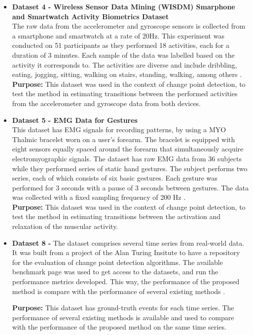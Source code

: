 \begin{itemize}
    
\item \textbf{Dataset 4 - Wireless Sensor Data Mining (WISDM) Smarphone and Smartwatch Activity Biometrics Dataset}\\
The raw data from the accelerometer and gyroscope sensors is collected from a smartphone and smartwatch at a rate of 20Hz. This experiment was conducted on 51 participants as they performed 18 activities, each for a duration of 3 minutes. Each sample of the data was labelled based on the activity it corresponds to. The activities are diverse and include dribbling, eating, jogging, sitting, walking on stairs, standing, walking, among others \cite{dataset4}.\\
\textbf{Purpose:} This dataset was used in the context of change point detection, to test the method in estimating transitions between the performed activities from the accelerometer and gyroscope data from both devices.
    
\item \textbf{Dataset 5 - EMG Data for Gestures}\\
This dataset has EMG signals for recording patterns, by using a MYO Thalmic bracelet worn on a user's forearm. The bracelet is equipped with eight sensors equally spaced around the forearm that simultaneously acquire electromyographic signals. The dataset has raw EMG data from 36 subjects while they performed series of static hand gestures. The subject performs two series, each of which consists of six basic gestures. Each gesture was performed for 3 seconds with a pause of 3 seconds between gestures. The data was collected with a fixed sampling frequency of 200 Hz \cite{dataset5}.\\
\textbf{Purpose:} This dataset was used in the context of change point detection, to test the method in estimating transitions between the activation and relaxation of the muscular activity.
    
    
    \item \textbf{Dataset 8 - } The dataset comprises several time series from real-world data. It was built from a project of the Alan Turing Insitute to have a repository for the evaluation of change point detection algorithms. The available benchmark page was used to get access to the datasets, and run the performance metrics developed. This way, the performance of the proposed method is compare with the performance of several existing methods \cite{cpd_alan}.
    \par
    \textbf{Purpose:} This dataset has ground-truth events for each time series. The performance of several existing methods is available and used to compare with the performance of the proposed method on the same time series.

\end{itemize}
    
